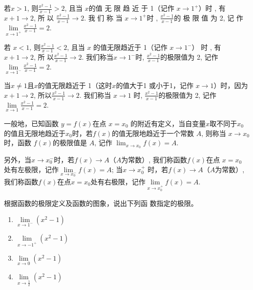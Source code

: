 \begin{figure}[htp]
    \centering
{}
    \caption{}
\end{figure}

若$x> 1$, 则$\frac {x^{2}- 1}{x- 1}> 2$, 且当 $x$的值 无 限 趋 近 于 1（记作 $x\to 1^{+ }$）时 , 有 $x+ 1\to 2$, 所 以 $\frac {x^{2}- 1}{x- 1}\to 2$. 我 们 称 当  $x\to 1^{+ }$时 , $\frac {x^{2}- 1}{x- 1}$的 极 限 值 为  2, 记 作
$\lim\limits_{x\to1^+}\frac{x^2-1}{x-1}=2$.

若 $x<1$, 则$\frac{x^{2}-1}{x-1}<2$, 且当 $x$ 的值无限趋近于 1（记作
$x\to 1^{- }$） 时 , 有$x+ 1\to 2$, 所 以$\frac {x^{2}- 1}{x- 1}\to 2$. 我们称当$x\to1^-$时, 
$\frac{x^2-1}{x-1}$的极限值为 2, 记作$\lim\limits_{x\to1^-}\frac{x^2-1}{x-1}=2$.

当$x\neq1$且$x$的值无限趋近于 1（这时$x$的值大于1 或小于1，记作 $x\to1$）时，因为 $x+1\to2$, 所以$\frac{x^{2}-1}{x-1}\to2$. 我们称当
$x\to1$ 时, $\frac{x^{2}-1}{x-1}$的极限值为 2, 记作$\lim\limits_{x\to1}\frac{x^{2}-1}{x-1}=2$.

一般地，已知函数 $y=f(x)$在点 $x=x_0$ 的附近有定义，当自变量$x$取不同于$x_0$的值且无限地趋近于$x_0$时，若$f(x)$的值无限地趋近于一个常数 $A$, 则称当 $x\to x_0$ 时，函数 $f(x)$的极限值是 $A$, 记作 $\lim_{x\to x_0}\limits f(x)=A$.

另外，当$x\to x_0^-$时，若$f(x)\to A$（$A$为常数）, 我们称函数$f(x)$在点 $x=x_0$ 处有左极限，记作$\lim\limits_{x\to x_{0}^-}f(x)=A$; 当$x\to x_{0}^{+}$ 时，若$f(x)\to A$（$A$为常数）, 我们称函数$f(x)$在点$x=x_0$处有右极限，记作$\lim\limits_{x\to x^+_0}f(x)=A$.

\begin{example}
根据函数的极限定义及函数的图象，说出下列函
数指定的极限。
\begin{multicols}{2}
\begin{enumerate}[(1)]
    \item $ \lim\limits _{x\to 1^{- }}\left ( x^{2}- 1\right )$
    \item $\lim\limits _{x\to - 1^{+ }}\left ( x^{2}- 1\right )$
    \item $\lim\limits _{x\to 0}( x^{2}- 1)$
    \item $\lim\limits _{x\to \tfrac 12}( x^{2}- 1) $
\end{enumerate}
\end{multicols}
\end{example}

